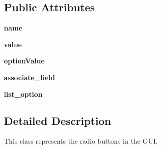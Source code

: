 \subsection*{Public Attributes}
\begin{DoxyCompactItemize}
\item 
\hypertarget{classButtonRadio_1_1ButtonRadio_a4cce572fb565cf1fa9c9172847a3f39c}{{\bfseries name}}\label{classButtonRadio_1_1ButtonRadio_a4cce572fb565cf1fa9c9172847a3f39c}

\item 
\hypertarget{classButtonRadio_1_1ButtonRadio_a37ae8eab733e072a949ba12e630d5047}{{\bfseries value}}\label{classButtonRadio_1_1ButtonRadio_a37ae8eab733e072a949ba12e630d5047}

\item 
\hypertarget{classButtonRadio_1_1ButtonRadio_ab597b88752502276037f7596350e551d}{{\bfseries option\+Value}}\label{classButtonRadio_1_1ButtonRadio_ab597b88752502276037f7596350e551d}

\item 
\hypertarget{classButtonRadio_1_1ButtonRadio_aa0b53898bca168d830ee8736818bbc10}{{\bfseries associate\+\_\+field}}\label{classButtonRadio_1_1ButtonRadio_aa0b53898bca168d830ee8736818bbc10}

\item 
\hypertarget{classButtonRadio_1_1ButtonRadio_a92992b469f6a513b17e566d53823acf8}{{\bfseries list\+\_\+option}}\label{classButtonRadio_1_1ButtonRadio_a92992b469f6a513b17e566d53823acf8}

\end{DoxyCompactItemize}


\subsection{Detailed Description}
This class represents the radio buttons in the G\+U\+I. 

